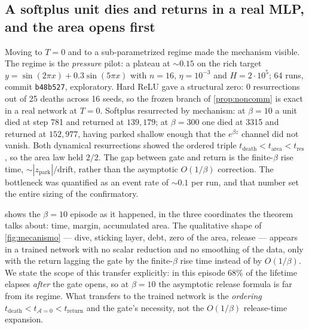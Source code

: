 \documentclass[11pt]{article}
\theoremstyle{definition}
\theoremstyle{remark}
\begin{document}
\subsection{A softplus unit dies and returns in a real MLP, and the area opens first}\label{sec:mechanism}

Moving to $T=0$ and to a sub-parametrized regime made the mechanism visible. The
regime is the \emph{pressure} pilot: a plateau at $\sim0.15$ on the rich target
$y=\sin(2\pi x)+0.3\sin(5\pi x)$ with $n=16$, $\eta=10^{-3}$ and
$H=2\cdot10^{5}$; 64 runs, commit \texttt{b48b527}, exploratory. Hard ReLU gave a
structural zero: 0 resurrections out of 25 deaths across 16 seeds, so the frozen
branch of \cref{prop:noncomm} is exact in a real network at $T=0$. Softplus
resurrected by mechanism: at $\beta=10$ a unit died at step 781 and returned at
$139{,}179$; at $\beta=300$ one died at 3315 and returned at $152{,}977$, having
parked shallow enough that the $e^{\beta z}$ channel did not vanish. Both
dynamical resurrections showed the ordered triple
$t_{\mathrm{death}}<t_{\mathrm{area}}<t_{\mathrm{res}}$, so the area law held
$2/2$. The gap between gate and return is the finite-$\beta$ rise time,
$\sim|z_{\mathrm{park}}|/\mathrm{drift}$, rather than the asymptotic $O(1/\beta)$
correction. The bottleneck was quantified as an event rate of $\sim0.1$ per run,
and that number set the entire sizing of the confirmatory.

 shows the $\beta=10$ episode as it happened, in the three
coordinates the theorem talks about: time, margin, accumulated area. The
qualitative shape of \cref{fig:mecanismo} --- dive, sticking layer, debt,
zero of the area, release --- appears in a trained network with no scalar
reduction and no smoothing of the data, only with the return lagging the gate by
the finite-$\beta$ rise time instead of by $O(1/\beta)$. We state the scope of
this transfer explicitly: in this episode $68\%$ of the lifetime elapses
\emph{after} the gate opens, so at $\beta=10$ the asymptotic release formula is
far from its regime. What transfers to the trained network is the
\emph{ordering} $t_{\mathrm{death}}<t_{\mathcal A=0}<t_{\mathrm{return}}$ and
the gate's necessity, not the $O(1/\beta)$ release-time expansion.
\end{document}
